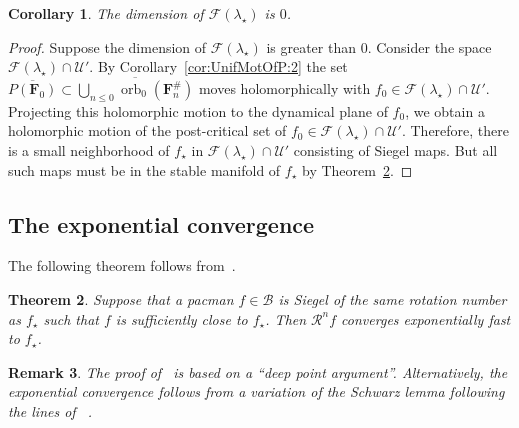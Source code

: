 \documentclass[]{amsart}
\newcommand\RR{\mathcal{R}}
\newcommand\FF{\mathcal{F}}
\newcommand{\bF}{{\mathbf F}}
\newcommand{\str}{{\star}}
\newcommand\UU{\mathcal{U}}
\newcommand\BB{\mathcal{B}}
\newtheorem{thm}{Theorem}[section]
\newtheorem{cor}[thm]{Corollary}
\newtheorem{rem}[thm]{Remark}
\theoremstyle{remark}
\numberwithin{equation}{section}
\theoremstyle{definition}
\newcommand{\orb}{\operatorname{orb}}
\begin{document}
\begin{cor}
\label{cor:WWu has dim 1}
The dimension of $\FF(\lambda_\str)$ is $0$.
\end{cor}
\begin{proof}
Suppose the dimension of $\FF(\lambda_\str)$ is greater than $0$. Consider the space $\FF(\lambda_\str)\cap \UU'$. By Corollary~\ref{cor:UnifMotOfP:2} the set $\overline {P(\bF_{0})}\subset \overline{\bigcup_{n\le 0}\orb_0(\bF^{\#}_{n})}$ moves holomorphically with $f_0\in \FF(\lambda_\str)\cap \UU'$. Projecting this holomorphic motion to the dynamical plane of $f_0$, we obtain a holomorphic motion of the post-critical set of $f_0\in \FF(\lambda_\str)\cap \UU'$. Therefore, there is a small neighborhood of $f_\str$ in $\FF(\lambda_\str)\cap \UU'$ consisting of Siegel maps. But all such maps must be in the stable manifold of $f_\str$ by Theorem~\ref{thm:ExpConv}. 
\end{proof}

\subsection{The exponential convergence}
\label{ss:ExpConv}
The following theorem follows from~\cite[Theorem 8.1]{McM3}. 
\begin{thm}
\label{thm:ExpConv}
Suppose that a pacman $f\in \BB$ is Siegel of the same rotation number as $f_\str$ such that $f$ is sufficiently close to $f_\str$. Then $\RR^n f$ converges exponentially fast to $f_\str$. 
\end{thm}

 
\begin{rem}
The proof of~\cite[Theorem 8.1]{McM3} is based on a ``deep point argument''. Alternatively, the exponential convergence follows from a variation of the Schwarz lemma following the lines of~ \cites{L:FCT,AL-horseshoe}.
\end{rem}
\end{document}

